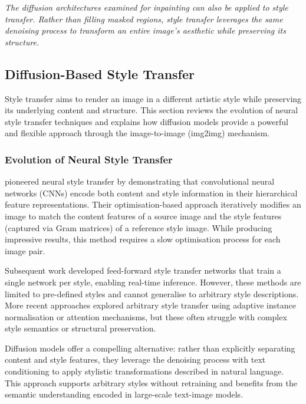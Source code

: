 \documentclass[12pt,a4paper]{report}
\begin{document}
\noindent\textit{The diffusion architectures examined for inpainting can also be applied to style transfer. Rather than filling masked regions, style transfer leverages the same denoising process to transform an entire image's aesthetic while preserving its structure.}

\subsection{Diffusion-Based Style Transfer}

Style transfer aims to render an image in a different artistic style while preserving its underlying content and structure. This section reviews the evolution of neural style transfer techniques and explains how diffusion models provide a powerful and flexible approach through the image-to-image (img2img) mechanism.

\subsubsection{Evolution of Neural Style Transfer}

\citet{gatys2016style} pioneered neural style transfer by demonstrating that convolutional neural networks (CNNs) encode both content and style information in their hierarchical feature representations. Their optimisation-based approach iteratively modifies an image to match the content features of a source image and the style features (captured via Gram matrices) of a reference style image. While producing impressive results, this method requires a slow optimisation process for each image pair.

Subsequent work developed feed-forward style transfer networks that train a single network per style, enabling real-time inference. However, these methods are limited to pre-defined styles and cannot generalise to arbitrary style descriptions. More recent approaches explored arbitrary style transfer using adaptive instance normalisation or attention mechanisms, but these often struggle with complex style semantics or structural preservation.

Diffusion models offer a compelling alternative: rather than explicitly separating content and style features, they leverage the denoising process with text conditioning to apply stylistic transformations described in natural language. This approach supports arbitrary styles without retraining and benefits from the semantic understanding encoded in large-scale text-image models.
\end{document}
